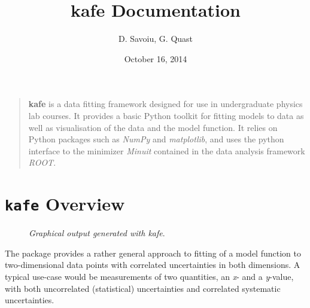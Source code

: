 \documentclass[a4paper,10pt,english]{sphinxmanual}
\title{kafe Documentation}
\date{October 16, 2014}
\author{D. Savoiu, G. Quast}
\begin{document}
\maketitle
\tableofcontents
{}\label{index::doc}

\begin{quote}

\textbf{kafe} is a data fitting framework designed for use in undergraduate
physics lab courses. It provides a basic Python toolkit for fitting
models to data as well as visualisation of the data and the model function.
It relies on Python packages such as \emph{NumPy} and \emph{matplotlib}, and uses
the python interface to the minimizer \emph{Minuit} contained in the data
analysis framework \emph{ROOT}.
\end{quote}


\chapter{\texttt{kafe} Overview}
\label{index:welcome-to-kafe-karlsruhe-fit-environment}\label{index:kafe-overview}\begin{figure}[htbp]\begin{flushright}
\capstart

\caption{\emph{Graphical output generated with kafe}.}\end{flushright}\end{figure}

The  package provides a rather general approach to fitting of a model
function to two-dimensional data points with correlated uncertainties in both
dimensions. A typical use-case would be measurements of two quantities,
an \emph{x}- and a \emph{y}-value, with both uncorrelated (statistical) uncertainties
and correlated systematic uncertainties.
\end{document}
